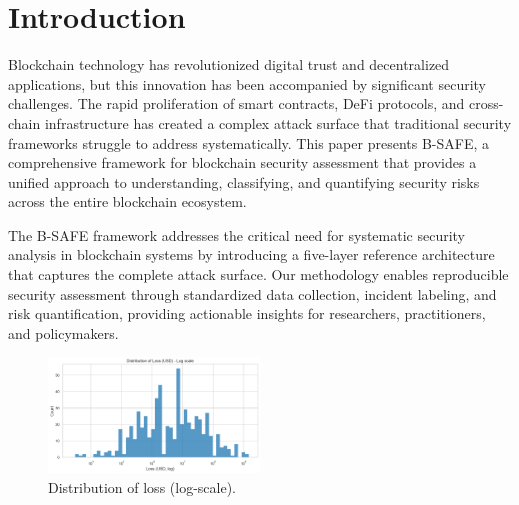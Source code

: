 \section{Introduction}
Blockchain technology has revolutionized digital trust and decentralized applications, but this innovation has been accompanied by significant security challenges. The rapid proliferation of smart contracts, DeFi protocols, and cross-chain infrastructure has created a complex attack surface that traditional security frameworks struggle to address systematically. This paper presents B-SAFE, a comprehensive framework for blockchain security assessment that provides a unified approach to understanding, classifying, and quantifying security risks across the entire blockchain ecosystem.

The B-SAFE framework addresses the critical need for systematic security analysis in blockchain systems by introducing a five-layer reference architecture that captures the complete attack surface. Our methodology enables reproducible security assessment through standardized data collection, incident labeling, and risk quantification, providing actionable insights for researchers, practitioners, and policymakers.

\begin{figure}[H]
\centering
\includegraphics[width=0.5\textwidth]{../figure/Figure/figures_2/A1_hist_loss_log.png}
\caption{Distribution of loss (log-scale).}
\label{fig:loss_distribution}
\end{figure}